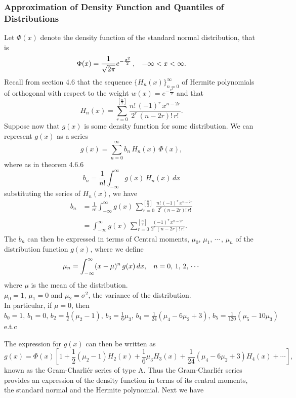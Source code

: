 \documentclass[12pt,a4paper]{report}
\theoremstyle{definition}
\theoremstyle{plain}
\begin{document}
\subsubsection{Approximation of Density Function and Quantiles of Distributions}
\vspace{-5mm}
Let $\Phi(x)$ denote the density function of the standard normal distribution, that is  $$\Phi(x) = \frac{1}{\sqrt{2\pi}}e^{-\frac{x^2}{2}}\, , \hspace{0.3cm} -\infty < x  < \infty.$$
Recall from section 4.6 that the sequence $\{H_n(x)\}^{\infty}_{n=0}$ of Hermite polynomials of orthogonal with respect to the weight $w(x) = e^{-\frac{x^2}{2}}$ and that 
$$H_n(x) = \sum_{r=0}^{\left[\frac{n}{2}\right]}\frac{n!\, (-1)^r\, x^{n-2r}}{2^r\, (n - 2r)!\, r!}.$$
Suppose now that $g(x)$ is some density function for some distribution. We can represent $g(x)$ as a series $$g(x) = \sum_{n=0}^{\infty} b_n\, H_n(x)\, \Phi(x),$$ where as in theorem 4.6.6 $$b_n = \frac{1}{n!}\int_{-\infty}^{\infty} g(x)\, H_n(x)\, dx$$
substituting the series of $H_n(x)$, we have 
\begin{align*}
b_n & = \frac{1}{n!}\int_{-\infty}^{\infty} g(x)\, \sum_{r = 0}^{\left[\frac{n}{2}\right]}\frac{n!\, (-1)^r\, x^{n-2r}}{2^r\, (n - 2r)!\, r!}\\\\
& = \int_{-\infty}^{\infty} g(x)\, \sum_{r=0}^{\left[\frac{n}{2}\right]} \frac{(-1)^r\, x^{n-2r}}{2^r\, (n-2r)!\, r!}.
\end{align*}
The $b_n$ can then be expressed in terms of Central moments, $\mu_0, \, \mu_1, \, \cdots\, , \, \mu_n$ of the distribution function $g(x)$, where we define $$\mu_n = \int_{-\infty}^{\infty} (x - \mu)^n\, g(x)\, dx, \hspace{0.3cm} n = 0, \, 1,\, 2, \, \cdots$$
where $\mu$ is the mean of the distribution.\\
$\mu_0 = 1, \, \mu_1 = 0$ and  $\mu_2 = \sigma^2$, the variance of the distribution.\\


In particular, if $\mu = 0$, then $b_0 = 1,\, b_1 = 0, \, b_2 = \frac{1}{2}(\mu_2 - 1), \, b_3 = \frac{1}{6}\mu_3, \, b_4 = \frac{1}{24}(\mu_4-6\mu_2 + 3), \, b_5 = \frac{1}{120}(\mu_5 - 10\mu_3)\,$ e.t.c


The expression for $g(x)$ can then be written as
$$g(x) = \Phi(x)\left[1 + \frac{1}{2}(\mu_2-1)H_2(x) + \frac{1}{6}\mu_3H_3(x) + \frac{1}{24}(\mu_4-6\mu_2 + 3)H_4(x) + \cdots\right],$$
known as the Gram-Charli\'{e}r series of type A. Thus the Gram-Charli\'{e}r series provides an expression of the density function in terms of its central moments, the standard normal and the Hermite polynomial. Next we have
\end{document}
